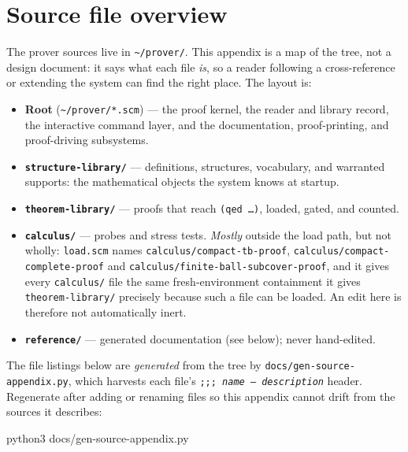 \chapter{Source file overview}
\label{app:source}

The prover sources live in \texttt{\textasciitilde/prover/}.  This appendix is a
map of the tree, not a design document: it says what each file \emph{is}, so a
reader following a cross-reference or extending the system can find the right
place.  The layout is:

\begin{itemize}
\item \textbf{Root} (\texttt{\textasciitilde/prover/*.scm}) --- the proof
  kernel, the reader and library record, the interactive command layer, and the
  documentation, proof-printing, and proof-driving subsystems.
\item \textbf{\texttt{structure-library/}} --- definitions, structures,
  vocabulary, and warranted supports: the mathematical objects the system knows
  at startup.
\item \textbf{\texttt{theorem-library/}} --- proofs that reach \texttt{(qed
  \ldots)}, loaded, gated, and counted.
\item \textbf{\texttt{calculus/}} --- probes and stress tests.  \emph{Mostly}
  outside the load path, but not wholly: \texttt{load.scm} names
  \texttt{calculus/compact-tb-proof},
  \texttt{calculus/compact-complete-proof} and
  \texttt{calculus/finite-ball-subcover-proof}, and it gives every
  \texttt{calculus/} file the same fresh-environment containment it gives
  \texttt{theorem-library/} precisely because such a file can be loaded.  An
  edit here is therefore not automatically inert.
\item \textbf{\texttt{reference/}} --- generated documentation (see below); never
  hand-edited.
\end{itemize}

\begin{remark}
The file listings below are \emph{generated} from the tree by
\texttt{docs/gen-source-appendix.py}, which harvests each file's
\texttt{;;;\ \textit{name} -- \textit{description}} header.  Regenerate after
adding or renaming files so this appendix cannot drift from the sources it
describes:
\begin{VNBsnip}
python3 docs/gen-source-appendix.py
\end{VNBsnip}
\end{remark}



